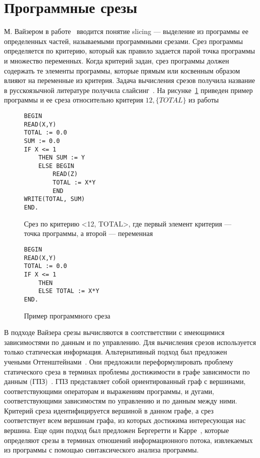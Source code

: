 \section{Программные срезы}
М. Вайзером в работе~\cite{weiser1981program} вводится понятие slicing --- выделение из программы ее определенных частей, называемыми программными срезами. Срез программы определяется по критерию, который как правило задается парой точка программы и множество переменных. Когда критерий задан, срез программы должен содержать те элементы программы, которые прямым или косвенным образом влияют на переменные из критерия. Задача вычисления срезов получила название в русскоязычной литературе получила слайсинг~\cite{2002slicing}. На рисунке~\ref{ex:slice} приведен пример программы и ее среза относительно критерия \(12, \{TOTAL\}\) из работы~\cite{weiser1981program}
\begin{figure}[]
\begin{lstlisting}
BEGIN
READ(X,Y)
TOTAL := 0.0
SUM := 0.0
IF X <= 1
	THEN SUM := Y
	ELSE BEGIN
		READ(Z)
		TOTAL := X*Y
		END
WRITE(TOTAL, SUM)
END.
\end{lstlisting}
Срез по критерию <12, {TOTAL}>, где первый элемент критерия --- точка программы, а второй --- переменная
\begin{lstlisting}
BEGIN
READ(X,Y)
TOTAL := 0.0
IF X <= 1
	THEN 
	ELSE TOTAL := X*Y
END.
\end{lstlisting}
\caption{Пример программного среза}
\label{ex:slice}
\end{figure}
В подходе Вайзера срезы вычисляются в соотстветствии с имеющимися зависимостями по данным и по управлению. Для вычисления срезов используется только статическая информация. Альтернативный подход был предложен учеными Оттенштейнами~\cite{ottenstein1984program}. Они предложили переформулировать проблему статического среза в терминах проблемы достижимости в графе зависимости по данным (ГПЗ)~\cite{ferrante1987program}. ГПЗ представляет собой ориентированный граф с вершинами, соответствующими операторам и выражениям программы, и дугами, соответствующими зависимостям по управлению и по данным между ними. Критерий среза идентифицируется вершиной в данном графе, а срез соответствует всем вершинам графа, из которых достижима интересующая нас вершина. Еще один подход был предложен Бергеретти и Карре~\cite{bergeretti1985information}, которые определяют срезы в терминах отношений информационного потока, извлекаемых из программы с помощью синтаксического анализа программы. 


